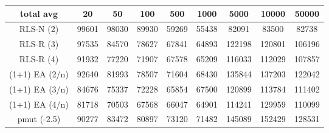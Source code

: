 \begin{tabular}[h]{ccccccccc}
total avg&20&50&100&500&1000&5000&10000&50000\\\hline
RLS-N (2)&99601&98030&89930&59269&55438&82091&83500&82738\\
RLS-R (3)&97535&84570&78627&67841&64893&122198&120801&106196\\
RLS-R (4)&91932&77220&71907&67578&65209&116033&112029&107857\\
(1+1) EA (2/n)&92640&81993&78507&71604&68430&135844&137203&122042\\
(1+1) EA (3/n)&84676&75337&72228&65854&67500&120899&113784&111402\\
(1+1) EA (4/n)&81718&70503&67568&66047&64901&114241&129959&110099\\
pmut (-2.5)&90277&83472&80897&73120&71482&145089&152429&128531\\
\end{tabular}

